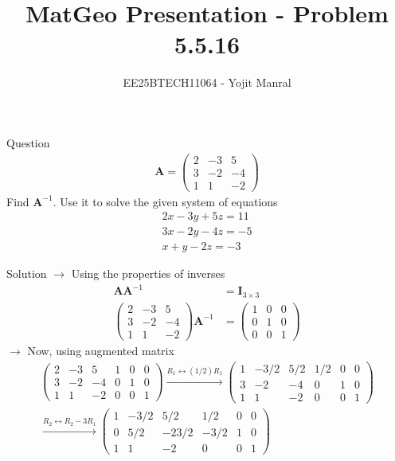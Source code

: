 \documentclass{beamer}
\title{MatGeo Presentation - Problem 5.5.16}
\author{EE25BTECH11064 - Yojit Manral}
\date{}
\numberwithin{equation}{section}
\theoremstyle{remark}
\newcommand{\myvec}[1]{\ensuremath{\begin{pmatrix}#1\end{pmatrix}}}
\let\vec\mathbf
\begin{document}
\frame{\titlepage}
\begin{frame}{Question}
\begin{align}
    \vec{A} = \myvec{2&-3&5\\3&-2&-4\\1&1&-2}
\end{align}
Find $\vec{A}^{-1}$. Use it to solve the given system of equations
\begin{align}
2x - 3y + 5z = 11 \\
3x - 2y - 4z = -5 \\
x + y - 2z = -3
\end{align}
\end{frame}

\begin{frame}{Solution}
$\rightarrow$ Using the properties of inverses
\begin{align}
    \vec{A} \vec{A}^{-1} &= \vec{I}_{3\times3} \\
    \myvec{2&-3&5\\3&-2&-4\\1&1&-2}\vec{A}^{-1} &= \myvec{1&0&0\\0&1&0\\0&0&1}
\end{align}
$\rightarrow$ Now, using augmented matrix
\begin{align}
\left(\begin{array}{ccc|ccc} 2&-3&5&1&0&0\\3&-2&-4&0&1&0\\1&1&-2&0&0&1 \end{array}\right)
\xrightarrow{R_1 \leftrightarrow (1/2)R_1} \left(\begin{array}{ccc|ccc} 1&-3/2&5/2&1/2&0&0\\3&-2&-4&0&1&0\\1&1&-2&0&0&1 \end{array}\right) \\
\xrightarrow{R_2 \leftrightarrow R_2 - 3R_1} \left(\begin{array}{ccc|ccc} 1&-3/2&5/2&1/2&0&0\\0&5/2&-23/2&-3/2&1&0\\1&1&-2&0&0&1 \end{array}\right)
\end{align}
\end{frame}
\end{document}

